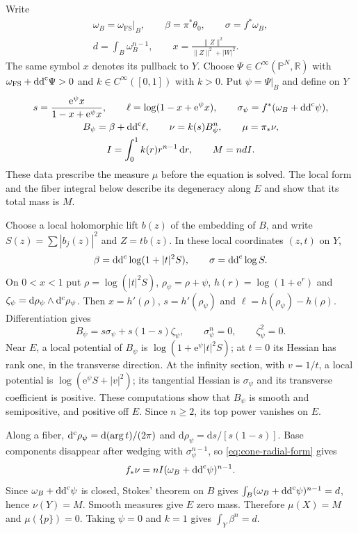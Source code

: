Write
\[
\begin{gathered}
\omega_B=\omega_{\mathrm{FS}}|_B,\qquad \beta=\pi^*\theta_0,\qquad \sigma=f^*\omega_B,\\
d=\int_B\omega_B^{n-1},\qquad x=\frac{\|Z\|^2}{\|Z\|^2+|W|^2}.
\end{gathered}
\]
The same symbol $x$ denotes its pullback to $Y$. Choose $\Psi\in C^\infty(\mathbb P^N,\mathbb R)$ with $\omega_{\mathrm{FS}}+\mathrm{dd}^{\mathrm{c}}\Psi>0$ and $k\in C^\infty([0,1])$ with $k>0$. Put $\psi=\Psi|_B$ and define on $Y$
\begin{equation}\label{eq:cone-prescribed-data}
\begin{gathered}
s=\frac{\mathrm{e}^\psi x}{1-x+\mathrm{e}^\psi x},\qquad \ell=\log(1-x+\mathrm{e}^\psi x),\qquad \sigma_\psi=f^*(\omega_B+\mathrm{dd}^{\mathrm{c}}\psi),\\
B_\psi=\beta+\mathrm{dd}^{\mathrm{c}}\ell,\qquad \nu=k(s)B_\psi^n,\qquad \mu=\pi_*\nu,\\
I=\int_0^1 k(r)r^{n-1}\,\mathrm{d} r,\qquad M=ndI.
\end{gathered}
\end{equation}
These data prescribe the measure $\mu$ before the equation is solved. The local form and the fiber integral below describe its degeneracy along $E$ and show that its total mass is $M$.

Choose a local holomorphic lift $b(z)$ of the embedding of $B$, and write $S(z)=\sum|b_j(z)|^2$ and $Z=t b(z)$. In these local coordinates $(z,t)$ on $Y$,
\[
\beta=\mathrm{dd}^{\mathrm{c}}\log(1+|t|^2S),\qquad \sigma=\mathrm{dd}^{\mathrm{c}}\log S.
\]
On $0<x<1$ put $\rho=\log(|t|^2S)$, $\rho_\psi=\rho+\psi$, $h(r)=\log(1+\mathrm{e}^r)$ and $\zeta_\psi=\mathrm{d}\rho_\psi\wedge\mathrm d^{\mathrm c}\rho_\psi$. Then $x=h'(\rho)$, $s=h'(\rho_\psi)$ and $\ell=h(\rho_\psi)-h(\rho)$. Differentiation gives
\begin{equation}\label{eq:cone-radial-form}
B_\psi=s\sigma_\psi+s(1-s)\zeta_\psi,\qquad \sigma_\psi^n=0,\qquad \zeta_\psi^2=0.
\end{equation}
Near $E$, a local potential of $B_\psi$ is $\log(1+\mathrm{e}^\psi|t|^2S)$; at $t=0$ its Hessian has rank one, in the transverse direction. At the infinity section, with $v=1/t$, a local potential is $\log(\mathrm{e}^\psi S+|v|^2)$; its tangential Hessian is $\sigma_\psi$ and its transverse coefficient is positive. These computations show that $B_\psi$ is smooth and semipositive, and positive off $E$. Since $n\geq2$, its top power vanishes on $E$.

Along a fiber, $\mathrm d^{\mathrm c}\rho_\psi=\mathrm{d}(\arg t)/(2\pi)$ and $\mathrm{d}\rho_\psi=\mathrm{d} s/[s(1-s)]$. Base components disappear after wedging with $\sigma_\psi^{n-1}$, so \eqref{eq:cone-radial-form} gives
\[
f_*\nu=nI(\omega_B+\mathrm{dd}^{\mathrm{c}}\psi)^{n-1}.
\]
Since $\omega_B+\mathrm{dd}^{\mathrm{c}}\psi$ is closed, Stokes' theorem on $B$ gives $\int_B(\omega_B+\mathrm{dd}^{\mathrm{c}}\psi)^{n-1}=d$, hence $\nu(Y)=M$. Smooth measures give $E$ zero mass. Therefore $\mu(X)=M$ and $\mu(\{p\})=0$. Taking $\psi=0$ and $k=1$ gives $\int_Y\beta^n=d$.

